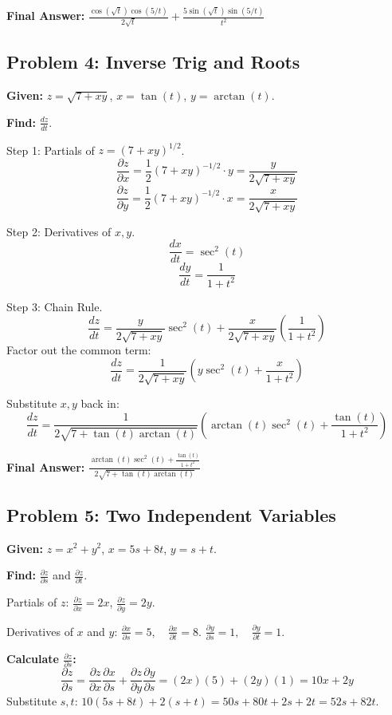 \documentclass[11pt, letterpaper]{article}
\theoremstyle{definition}
\begin{document}
\textbf{Final Answer:} $\boxed{\frac{\cos(\sqrt{t})\cos(5/t)}{2\sqrt{t}} + \frac{5\sin(\sqrt{t})\sin(5/t)}{t^2}}$


\subsection*{Problem 4: Inverse Trig and Roots}
\textbf{Given:} $z = \sqrt{7 + xy}$, $x = \tan(t)$, $y = \arctan(t)$.

\textbf{Find:} $\frac{dz}{dt}$.

Step 1: Partials of $z = (7+xy)^{1/2}$.
\[ \frac{\partial z}{\partial x} = \frac{1}{2}(7+xy)^{-1/2} \cdot y = \frac{y}{2\sqrt{7+xy}} \]
\[ \frac{\partial z}{\partial y} = \frac{1}{2}(7+xy)^{-1/2} \cdot x = \frac{x}{2\sqrt{7+xy}} \]

Step 2: Derivatives of $x, y$.
\[ \frac{dx}{dt} = \sec^2(t) \]
\[ \frac{dy}{dt} = \frac{1}{1+t^2} \]

Step 3: Chain Rule.
\[ \frac{dz}{dt} = \frac{y}{2\sqrt{7+xy}}\sec^2(t) + \frac{x}{2\sqrt{7+xy}}\left(\frac{1}{1+t^2}\right) \]
Factor out the common term:
\[ \frac{dz}{dt} = \frac{1}{2\sqrt{7+xy}} \left( y\sec^2(t) + \frac{x}{1+t^2} \right) \]

Substitute $x, y$ back in:
\[ \frac{dz}{dt} = \frac{1}{2\sqrt{7+\tan(t)\arctan(t)}} \left( \arctan(t)\sec^2(t) + \frac{\tan(t)}{1+t^2} \right) \]

\textbf{Final Answer:} $\boxed{\frac{\arctan(t)\sec^2(t) + \frac{\tan(t)}{1+t^2}}{2\sqrt{7+\tan(t)\arctan(t)}}}$


\subsection*{Problem 5: Two Independent Variables}
\textbf{Given:} $z = x^2 + y^2$, $x = 5s + 8t$, $y = s + t$.

\textbf{Find:} $\frac{\partial z}{\partial s}$ and $\frac{\partial z}{\partial t}$.

Partials of $z$: $\frac{\partial z}{\partial x} = 2x$, $\frac{\partial z}{\partial y} = 2y$.

Derivatives of $x$ and $y$:
$\frac{\partial x}{\partial s} = 5, \quad \frac{\partial x}{\partial t} = 8$.
$\frac{\partial y}{\partial s} = 1, \quad \frac{\partial y}{\partial t} = 1$.

\textbf{Calculate $\frac{\partial z}{\partial s}$:}
\[ \frac{\partial z}{\partial s} = \frac{\partial z}{\partial x}\frac{\partial x}{\partial s} + \frac{\partial z}{\partial y}\frac{\partial y}{\partial s} = (2x)(5) + (2y)(1) = 10x + 2y \]
Substitute $s, t$:
$10(5s+8t) + 2(s+t) = 50s + 80t + 2s + 2t = 52s + 82t$.
\end{document}
